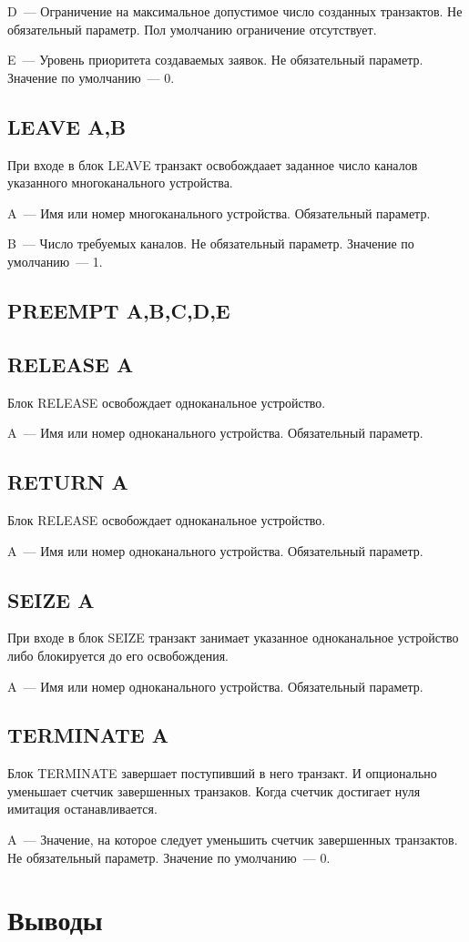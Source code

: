 D~--- Ограничение на максимальное допустимое число созданных транзактов. Не обязательный параметр. Пол умолчанию ограничение отсутствует.

E~--- Уровень приоритета создаваемых заявок. Не обязательный параметр. Значение по умолчанию~--- 0.

\subsection*{LEAVE A,B}

При входе в блок LEAVE транзакт освобождаает заданное число каналов указанного многоканального устройства.

A~--- Имя или номер многоканального устройства. Обязательный параметр.

B~--- Число требуемых каналов. Не обязательный параметр. Значение по умолчанию~--- 1.

\subsection*{PREEMPT A,B,C,D,E}

\subsection*{RELEASE A}

Блок RELEASE освобождает одноканальное устройство.

A~--- Имя или номер одноканального устройства. Обязательный параметр.

\subsection*{RETURN A}

Блок RELEASE освобождает одноканальное устройство.

A~--- Имя или номер одноканального устройства. Обязательный параметр.

\subsection*{SEIZE A}

При входе в блок SEIZE транзакт занимает указанное одноканальное устройство либо блокируется до его освобождения.

A~--- Имя или номер одноканального устройства. Обязательный параметр.

\subsection*{TERMINATE A}

Блок TERMINATE завершает поступивший в него транзакт. И опционально уменьшает счетчик завершенных транзаков. Когда счетчик достигает нуля имитация останавливается.

A~--- Значение, на которое следует уменьшить счетчик завершенных транзактов. Не обязательный параметр. Значение по умолчанию~--- 0.

\section{Выводы}

